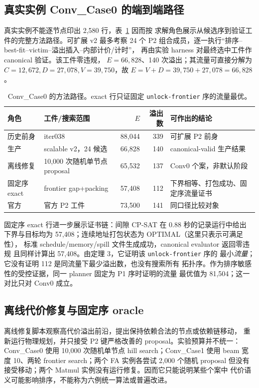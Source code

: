 \subsection{真实实例 Conv\_Case0 的端到端路径}

真实实例不能逐节点印出 2,580 行，表~\ref{tab:supp-conv0-path-zh} 因而按
求解角色展示从候选序到验证工件的完整方法路径。可扩展 v2 最多考察 24 个
P2 组合成员，逐一执行“排序--best-fit--victim--溢出插入--内部计价/计时”，
再由实验 harness 对最终选中工件作 canonical 验证。该工件零违规，
$E=66{,}828$、140 次溢出；其流量可直接分解为
$C=12{,}672,D=27{,}078,V=39{,}750$，故
$E=V+D=39{,}750+27{,}078=66{,}828$。

\begin{table}[H]
\centering
\caption{Conv\_Case0 的方法路径。exact 行只证固定 \texttt{unlock-frontier} 序的流量最优。}
\label{tab:supp-conv0-path-zh}
\begin{tabular}{@{}llrrp{.34\linewidth}@{}}
\toprule
角色 & 工件/搜索范围 & $E$ & 溢出数 & 可作出的结论\\
\midrule
历史前身 & iter038 & 88,044 & 339 & 可扩展 P2 前身\\
生产 & scalable v2，24 候选 & 66,828 & 140 & canonical-valid 生产结果\\
离线修复 & 10,000 次随机单节点 proposal & 65,532 & 137 & Conv0 个案，非默认阶段\\
固定序 exact & frontier gap+packing & 57,408 & 112 & 下界相等、打包成功、固定序流量证书\\
官方 & 官方 P2 工件 & 73,500 & 141 & 同口径比较对象\\
\bottomrule
\end{tabular}
\end{table}

固定序 exact 行进一步展示证书链：间隙 CP-SAT 在 0.88 秒的记录运行中给出
下界与目标均为 57,408；连续地址打包状态为 OPTIMAL（这里只表示可满足性），
标准 schedule/memory/spill 文件生成成功，canonical evaluator 返回零违规
且同样计算出 57,408。由定理 3，它证明该 \texttt{unlock-frontier} 序的
最小\emph{流量}；它没有证明 112 是同流量下最少溢出数，也没有搜索所有
拓扑序。作为排序敏感性的受控证据，同一 planner 固定为 P1 序时证明的流量
最优值为 81,504；这一对比只对 Conv0 成立。

\subsection{离线代价修复与固定序 oracle}

离线修复脚本观察高代价溢出前沿，提出保持依赖合法的节点或依赖链移动，
重新运行物理规划，并只接受 P2 键严格改善的 proposal。实验预算并不统一：
Conv\_Case0 使用 10,000 次随机单节点 hill search；Conv\_Case1 使用 beam
宽度 10、两轮 frontier search；两个 FA 实例各尝试 2,000 个随机 proposal
但没有接受移动；两个 Matmul 实例没有运行修复。因而它只能说明某些个案中
代价语义可能影响排序，不能称为六例统一算法或普遍改进。

